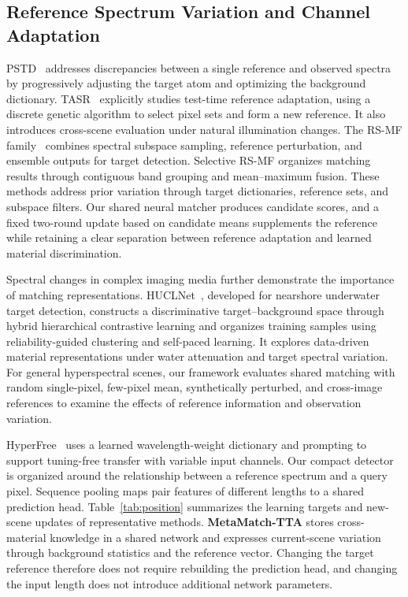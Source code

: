 \documentclass[a4paper,11pt]{article}
\newcommand{\method}{\textbf{MetaMatch-TTA}}
\begin{document}
\subsection{Reference Spectrum Variation and Channel Adaptation}
PSTD~\cite{pstd} addresses discrepancies between a single reference and observed spectra by progressively adjusting the target atom and optimizing the background dictionary. TASR~\cite{tasr} explicitly studies test-time reference adaptation, using a discrete genetic algorithm to select pixel sets and form a new reference. It also introduces cross-scene evaluation under natural illumination changes. The RS-MF family~\cite{rsmf2026} combines spectral subspace sampling, reference perturbation, and ensemble outputs for target detection. Selective RS-MF organizes matching results through contiguous band grouping and mean--maximum fusion. These methods address prior variation through target dictionaries, reference sets, and subspace filters. Our shared neural matcher produces candidate scores, and a fixed two-round update based on candidate means supplements the reference while retaining a clear separation between reference adaptation and learned material discrimination.

Spectral changes in complex imaging media further demonstrate the importance of matching representations. HUCLNet~\cite{huclnet2025}, developed for nearshore underwater target detection, constructs a discriminative target--background space through hybrid hierarchical contrastive learning and organizes training samples using reliability-guided clustering and self-paced learning. It explores data-driven material representations under water attenuation and target spectral variation. For general hyperspectral scenes, our framework evaluates shared matching with random single-pixel, few-pixel mean, synthetically perturbed, and cross-image references to examine the effects of reference information and observation variation.

HyperFree~\cite{hyperfree} uses a learned wavelength-weight dictionary and prompting to support tuning-free transfer with variable input channels. Our compact detector is organized around the relationship between a reference spectrum and a query pixel. Sequence pooling maps pair features of different lengths to a shared prediction head. Table~\ref{tab:position} summarizes the learning targets and new-scene updates of representative methods. \method{} stores cross-material knowledge in a shared network and expresses current-scene variation through background statistics and the reference vector. Changing the target reference therefore does not require rebuilding the prediction head, and changing the input length does not introduce additional network parameters.
\end{document}
